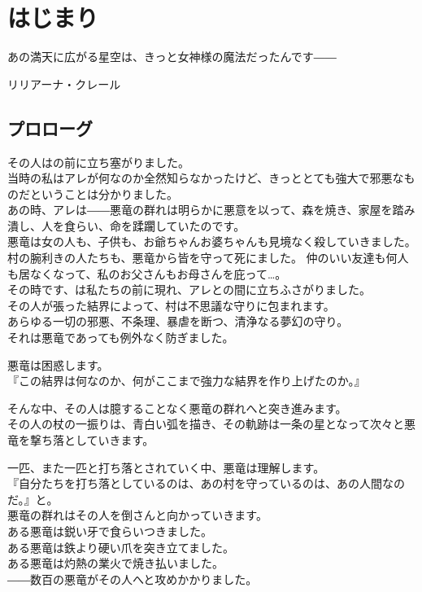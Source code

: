 \documentclass[oneside, a4paper]{jsbook}
\begin{document}
\chapter{はじまり}
\epigraph{あの満天に広がる星空は、きっと女神様の魔法だったんです――}{リリアーナ・クレール}

\section{プロローグ}

その人はの前に立ち塞がりました。\\

当時の私はアレが何なのか全然知らなかったけど、きっととても強大で邪悪なものだということは分かりました。\\
あの時、アレは――悪竜の群れは明らかに悪意を以って、森を焼き、家屋を踏み潰し、人を食らい、命を蹂躙していたのです。\\
悪竜は女の人も、子供も、お爺ちゃんお婆ちゃんも見境なく殺していきました。
村の腕利きの人たちも、悪竜から皆を守って死にました。
仲のいい友達も何人も居なくなって、私のお父さんもお母さんを庇って\dots 。\\


その時です、は私たちの前に現れ、アレとの間に立ちふさがりました。\\
その人が張った結界によって、村は不思議な守りに包まれます。\\
あらゆる一切の邪悪、不条理、暴虐を断つ、清浄なる夢幻の守り。\\
それは悪竜であっても例外なく防ぎました。

悪竜は困惑します。\\
『この結界は何なのか、何がここまで強力な結界を作り上げたのか。』

そんな中、その人は臆することなく悪竜の群れへと突き進みます。\\
その人の杖の一振りは、青白い弧を描き、その軌跡は一条の星となって次々と悪竜を撃ち落としていきます。

一匹、また一匹と打ち落とされていく中、悪竜は理解します。\\
『自分たちを打ち落としているのは、あの村を守っているのは、あの人間なのだ。』と。\\


悪竜の群れはその人を倒さんと向かっていきます。\\
ある悪竜は鋭い牙で食らいつきました。\\
ある悪竜は鉄より硬い爪を突き立てました。\\
ある悪竜は灼熱の業火で焼き払いました。\\
――数百の悪竜がその人へと攻めかかりました。\\
\end{document}
